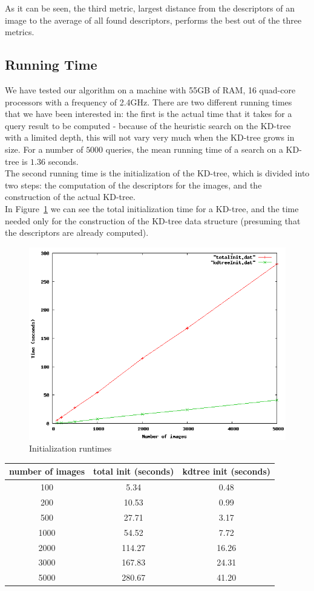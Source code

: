 \documentclass[conference]{IEEEtran}
\begin{document}
As it can be seen, the third metric, largest distance from the descriptors of an image to the average of all found descriptors, performs the best out of the three metrics.

\subsection{Running Time}
We have tested our algorithm on a machine with 55GB of RAM, 16 quad-core processors with a frequency of 2.4GHz.
There are two different running times that we have been interested in: the first is the actual time that it takes for a query result to be computed - because of the heuristic search on the KD-tree with a limited depth, this will not vary very much when the KD-tree grows in size. For a number of $5000$ queries, the mean running time of a search on a KD-tree is $1.36$ seconds.\\
The second running time is the initialization of the KD-tree, which is divided into two steps: the computation of the descriptors for the images, and the construction of the actual KD-tree.\\
In Figure~\ref{fig:totalInit} we can see the total initialization time for a KD-tree, and the time needed only for the construction of the KD-tree data structure (presuming that the descriptors are already computed). \\
\begin{figure}[ht!]
\centering
\includegraphics[width=.8\linewidth]{images/totalInit.png}
\caption{Initialization runtimes}
\label{fig:totalInit}
\end{figure}

\begin{tabular} {c | c | c}
	number of images & total init (seconds) & kdtree init (seconds) \\
	\hline
	100 & 5.34 & 0.48 \\
	200 & 10.53 & 0.99 \\
	500 & 27.71 & 3.17 \\
	1000 & 54.52 & 7.72 \\
	2000 & 114.27 & 16.26 \\
	3000 & 167.83 & 24.31 \\
	5000 & 280.67 & 41.20 \\
\end{tabular}
\end{document}

